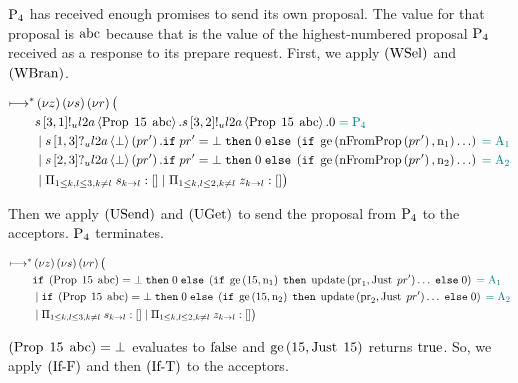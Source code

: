 $\Proposer{4}$ has received enough promises to send its own proposal.
The value for that proposal is $\ABC$ because that is the value of the highest-numbered proposal $\Proposer{4}$ received as a response to its prepare request.
First, we apply $\RWsel$ and $\RWbran$.

\begin{align*}
\mapstostar& \NuChannels \big (\\
&
    \SendUnreliableP{\ChannelS}{3}{1}{\LTwoA}{\ProposalC{15}{\ABC}}.
    \SendUnreliableP{\ChannelS}{3}{2}{\LTwoA}{\ProposalC{15}{\ABC}}.
    \End
    \comment{= \Proposer{4}}\\
&\Or
    \ReceiveUnreliableP{\ChannelS}{1}{3}{\LTwoA}{\bot}{pr'}.
    \If pr' = \bot
    \;\Then \End
    \;\Else \Paren{
        \If \greaterEqual{\nFromProposal{pr'}}{\NumberRegister_1}
        \ldots
    }
    \comment{= \Acceptor{1}}\\
&\Or
    \ReceiveUnreliableP{\ChannelS}{2}{3}{\LTwoA}{\bot}{pr'}.
    \If pr' = \bot
    \;\Then \End
    \;\Else \Paren{
        \If \greaterEqual{\nFromProposal{pr'}}{\NumberRegister_2}
        \ldots
    }
    \comment{= \Acceptor{2}}\\
&\Or \InnerSessionQueues{\ChannelS}
\Or \OuterSessionQueues
\big )
\end{align*}

Then we apply $\RUsend$ and $\RUget$ to send the proposal from $\Proposer{4}$ to the acceptors.
$\Proposer{4}$ terminates.

\begin{align*}
\mapstostar& \NuChannels \big (\\
&
    \If \Paren{\ProposalC{15}{\ABC}} = \bot
    \;\Then \End
    \;\Else \Paren{
        \If \greaterEqual{15}{\NumberRegister_1}
        \;\Then \update{\ProposalRegister_1}{\Just{pr'}}\ldots
        \;\Else \End
    }
    \comment{= \Acceptor{1}}\\
&\Or
    \If \Paren{\ProposalC{15}{\ABC}} = \bot
    \;\Then \End
    \;\Else \Paren{
        \If \greaterEqual{15}{\NumberRegister_2}
        \;\Then \update{\ProposalRegister_2}{\Just{pr'}}\ldots
        \;\Else \End
    }
    \comment{= \Acceptor{2}}\\
&\Or \InnerSessionQueues{\ChannelS}
\Or \OuterSessionQueues
\big )
\end{align*}

$\Paren{\ProposalC{15}{\ABC}} = \bot$ evaluates to $\False$ and $\greaterEqual{15}{\Just{15}}$ returns $\True$.
So, we apply $\RIfF$ and then $\RIfT$ to the acceptors.

